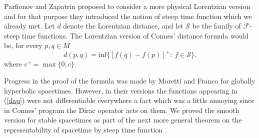 \documentclass[a4paper]{jpconf}
\theoremstyle{definition}
\theoremstyle{remark}
\begin{document}
Parfionov and Zapatrin \cite{parfionov00} proposed to consider a more physical Lorentzian version and for that purpose they introduced the notion of steep time function which we already met.
 Let $d$ denote the Lorentzian distance,  and let $\mathscr{S}$ be the family of $\mathscr{F}$-steep time functions. The Lorentzian version of Connes' distance formula would be, for every $p,q\in M$
\begin{equation} \label{dap}
 d(p,q)=\mathrm{inf} \big\{[f(q)-f(p)]^+\colon \ f \in \mathscr{S}\big\}.
\end{equation}
where $c^+=\max\{0, c\}$.

Progress in the proof of the formula was made by Moretti \cite{moretti03} and Franco \cite{franco10} for globally hyperbolic spacetimes. However, in their versions the  functions appearing in (\ref{dap}) were not differentiable everywhere a fact which was a little annoying since in Connes' program the Dirac operator acts on them.
We proved the smooth version for stable spacetimes as part of the next more general theorem on the representability of spacetime by steep time function \cite{minguzzi17}.
\end{document}
